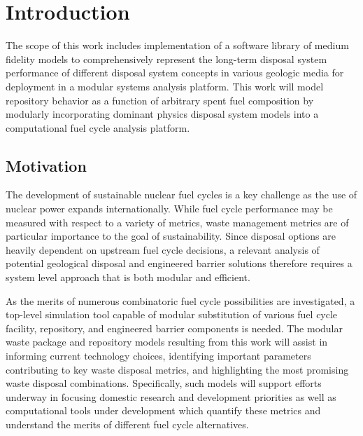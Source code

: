 \chapter{Introduction}\label{ch:introduction}

The scope of this work includes implementation of a software library 
of medium fidelity models to comprehensively represent the long-term 
disposal system performance of different disposal system concepts in 
various geologic media for deployment in a modular systems analysis 
platform.  This work will model repository behavior as a function of 
arbitrary spent fuel composition by modularly incorporating dominant 
physics disposal system models into a computational fuel cycle 
analysis platform.

\section{Motivation} 

The development of sustainable nuclear fuel cycles is a key challenge 
as the use of nuclear power expands internationally. While fuel cycle 
performance may be measured with respect to a variety of metrics, 
waste management metrics are of particular importance to the goal of 
sustainability. Since disposal options are heavily dependent on 
upstream fuel cycle decisions, a relevant analysis of potential 
geological disposal and engineered barrier solutions therefore 
requires a system level approach that is both modular and efficient. 

As the merits of numerous combinatoric fuel cycle possibilities are 
investigated, a top-level simulation tool capable of modular 
substitution of various fuel cycle facility, repository, and 
engineered barrier components is needed. The modular waste package and 
repository models resulting from this work will assist in informing 
current technology choices, identifying important parameters 
contributing to key waste disposal metrics, and highlighting the most 
promising waste disposal combinations. Specifically, such models will 
support efforts underway in focusing domestic research and development 
priorities as well as computational tools under development which 
quantify these metrics and understand the merits of different fuel 
cycle alternatives. 

